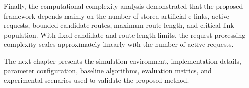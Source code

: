 Finally, the computational complexity analysis demonstrated that the proposed framework depends mainly on the number of stored artificial e-links, active requests, bounded candidate routes, maximum route length, and critical-link population. With fixed candidate and route-length limits, the request-processing complexity scales approximately linearly with the number of active requests.

The next chapter presents the simulation environment, implementation details, parameter configuration, baseline algorithms, evaluation metrics, and experimental scenarios used to validate the proposed method.
